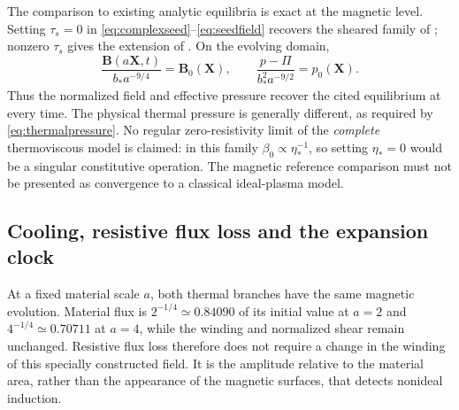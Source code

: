 \documentclass[11pt,a4paper]{article}
\theoremstyle{remark}\newtheorem{remark}{Remark}
\numberwithin{equation}{section}
\newcommand{\BB}{\boldsymbol B}
\newcommand{\XX}{\boldsymbol X}
\begin{document}
The comparison to existing analytic equilibria is exact at the magnetic level. Setting $\tau_s=0$ in \eqref{eq:complexseed}--\eqref{eq:seedfield} recovers the sheared family of \citet{Landreman}; nonzero $\tau_s$ gives the extension of \citet{Issan}. On the evolving domain,
\begin{equation}
\frac{\BB(a\XX,t)}{b_*a^{-9/4}}=\BB_0(\XX),\qquad
\frac{p-\Pi}{b_*^2a^{-9/2}}=p_0(\XX).
\label{eq:literaturerecovery}
\end{equation}
Thus the normalized field and effective pressure recover the cited equilibrium at every time. The physical thermal pressure is generally different, as required by \eqref{eq:thermalpressure}. No regular zero-resistivity limit of the \emph{complete} thermoviscous model is claimed: in this family $\beta_0\propto\eta_*^{-1}$, so setting $\eta_*=0$ would be a singular constitutive operation. The magnetic reference comparison must not be presented as convergence to a classical ideal-plasma model.

\subsection{Cooling, resistive flux loss and the expansion clock}
At a fixed material scale $a$, both thermal branches have the same magnetic evolution. Material flux is $2^{-1/4}\simeq0.84090$ of its initial value at $a=2$ and $4^{-1/4}\simeq0.70711$ at $a=4$, while the winding and normalized shear remain unchanged. Resistive flux loss therefore does not require a change in the winding of this specially constructed field. It is the amplitude relative to the material area, rather than the appearance of the magnetic surfaces, that detects nonideal induction.
\end{document}
